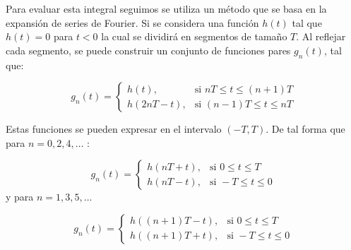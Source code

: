 \documentclass[11pt]{article}
\numberwithin{equation}{section} %
\begin{document}
Para evaluar esta integral seguimos se utiliza un método \cite{dubner1968} que se basa en la expansión de series de Fourier. Si se considera una función $h(t)$ tal que $h(t)=0$ para $t<0$ la cual se dividirá en segmentos de tamaño $T$. Al reflejar cada segmento, se puede construir un conjunto de funciones pares $g_n(t)$, tal que:

\[
g_n(t) =
\begin{cases}
h(t), & \mbox{si } nT\leq t \leq (n+1)T \\
h(2nT-t), & \mbox{si } (n-1)T \leq t \leq nT
\end{cases}
\]

Estas funciones se pueden expresar en el intervalo $(-T,T)$. De tal forma que para $n=0,2,4,\ldots$ :

\[
g_n(t) =
\begin{cases}
h(nT+t), & \mbox{si } 0 \leq t \leq T \\
h(nT-t), & \mbox{si } -T \leq t \leq 0
\end{cases}
\]
y para $n=1,3,5,\ldots$

\[
g_n(t) =
\begin{cases}
h((n+1)T-t), & \mbox{si } 0 \leq t \leq T \\
h((n+1)T+t), & \mbox{si } -T \leq t \leq 0
\end{cases}
\]
\end{document}
